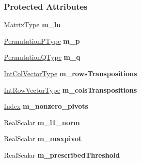 \subsubsection*{Protected Attributes}
\begin{DoxyCompactItemize}
\item 
\mbox{\label{group___l_u___module_a54cc3417a9e28a04f8ef483f78cf0dfe}} 
Matrix\+Type {\bfseries m\+\_\+lu}
\item 
\mbox{\label{group___l_u___module_a258c08971c2b010d38a22dfc8f041d7c}} 
\hyperlink{group___core___module}{Permutation\+P\+Type} {\bfseries m\+\_\+p}
\item 
\mbox{\label{group___l_u___module_a0ea897b9fb6a607583fa21e952383639}} 
\hyperlink{group___core___module}{Permutation\+Q\+Type} {\bfseries m\+\_\+q}
\item 
\mbox{\label{group___l_u___module_a9af26577db6b2c18943a68e5096fc224}} 
\hyperlink{class_eigen_1_1internal_1_1_tensor_lazy_evaluator_writable}{Int\+Col\+Vector\+Type} {\bfseries m\+\_\+rows\+Transpositions}
\item 
\mbox{\label{group___l_u___module_a75eccdabf5e738fc29832e8be6d335f4}} 
\hyperlink{class_eigen_1_1internal_1_1_tensor_lazy_evaluator_writable}{Int\+Row\+Vector\+Type} {\bfseries m\+\_\+cols\+Transpositions}
\item 
\mbox{\label{group___l_u___module_ad1f9f7abb67e34bd33f2277547ad3173}} 
\hyperlink{group___core___module_a554f30542cc2316add4b1ea0a492ff02}{Index} {\bfseries m\+\_\+nonzero\+\_\+pivots}
\item 
\mbox{\label{group___l_u___module_a451effd374678410bd2a64a5a5bedc33}} 
Real\+Scalar {\bfseries m\+\_\+l1\+\_\+norm}
\item 
\mbox{\label{group___l_u___module_a32573c2f821561caf4a9c535565b84d5}} 
Real\+Scalar {\bfseries m\+\_\+maxpivot}
\item 
\mbox{\label{group___l_u___module_a038301ef1afa7359095f320e7585c42a}} 
Real\+Scalar {\bfseries m\+\_\+prescribed\+Threshold}

\end{DoxyCompactItemize}
